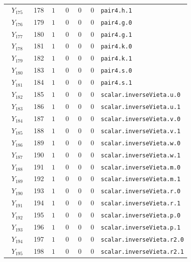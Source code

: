 {\begin{longtable}{@{}r r c r r r p{0.49\linewidth}@{}}
\(Y_{175}\) & 178 & \(1\) & 0 & 0 & 0 & \texttt{pair4.\allowbreak{}h.\allowbreak{}1} \\
\(Y_{176}\) & 179 & \(1\) & 0 & 0 & 0 & \texttt{pair4.\allowbreak{}g.\allowbreak{}0} \\
\(Y_{177}\) & 180 & \(1\) & 0 & 0 & 0 & \texttt{pair4.\allowbreak{}g.\allowbreak{}1} \\
\(Y_{178}\) & 181 & \(1\) & 0 & 0 & 0 & \texttt{pair4.\allowbreak{}k.\allowbreak{}0} \\
\(Y_{179}\) & 182 & \(1\) & 0 & 0 & 0 & \texttt{pair4.\allowbreak{}k.\allowbreak{}1} \\
\(Y_{180}\) & 183 & \(1\) & 0 & 0 & 0 & \texttt{pair4.\allowbreak{}s.\allowbreak{}0} \\
\(Y_{181}\) & 184 & \(1\) & 0 & 0 & 0 & \texttt{pair4.\allowbreak{}s.\allowbreak{}1} \\
\(Y_{182}\) & 185 & \(1\) & 0 & 0 & 0 & \texttt{scalar.\allowbreak{}inverseVieta.\allowbreak{}u.\allowbreak{}0} \\
\(Y_{183}\) & 186 & \(1\) & 0 & 0 & 0 & \texttt{scalar.\allowbreak{}inverseVieta.\allowbreak{}u.\allowbreak{}1} \\
\(Y_{184}\) & 187 & \(1\) & 0 & 0 & 0 & \texttt{scalar.\allowbreak{}inverseVieta.\allowbreak{}v.\allowbreak{}0} \\
\(Y_{185}\) & 188 & \(1\) & 0 & 0 & 0 & \texttt{scalar.\allowbreak{}inverseVieta.\allowbreak{}v.\allowbreak{}1} \\
\(Y_{186}\) & 189 & \(1\) & 0 & 0 & 0 & \texttt{scalar.\allowbreak{}inverseVieta.\allowbreak{}w.\allowbreak{}0} \\
\(Y_{187}\) & 190 & \(1\) & 0 & 0 & 0 & \texttt{scalar.\allowbreak{}inverseVieta.\allowbreak{}w.\allowbreak{}1} \\
\(Y_{188}\) & 191 & \(1\) & 0 & 0 & 0 & \texttt{scalar.\allowbreak{}inverseVieta.\allowbreak{}m.\allowbreak{}0} \\
\(Y_{189}\) & 192 & \(1\) & 0 & 0 & 0 & \texttt{scalar.\allowbreak{}inverseVieta.\allowbreak{}m.\allowbreak{}1} \\
\(Y_{190}\) & 193 & \(1\) & 0 & 0 & 0 & \texttt{scalar.\allowbreak{}inverseVieta.\allowbreak{}r.\allowbreak{}0} \\
\(Y_{191}\) & 194 & \(1\) & 0 & 0 & 0 & \texttt{scalar.\allowbreak{}inverseVieta.\allowbreak{}r.\allowbreak{}1} \\
\(Y_{192}\) & 195 & \(1\) & 0 & 0 & 0 & \texttt{scalar.\allowbreak{}inverseVieta.\allowbreak{}p.\allowbreak{}0} \\
\(Y_{193}\) & 196 & \(1\) & 0 & 0 & 0 & \texttt{scalar.\allowbreak{}inverseVieta.\allowbreak{}p.\allowbreak{}1} \\
\(Y_{194}\) & 197 & \(1\) & 0 & 0 & 0 & \texttt{scalar.\allowbreak{}inverseVieta.\allowbreak{}r2.\allowbreak{}0} \\
\(Y_{195}\) & 198 & \(1\) & 0 & 0 & 0 & \texttt{scalar.\allowbreak{}inverseVieta.\allowbreak{}r2.\allowbreak{}1} \\
\end{longtable}
}
